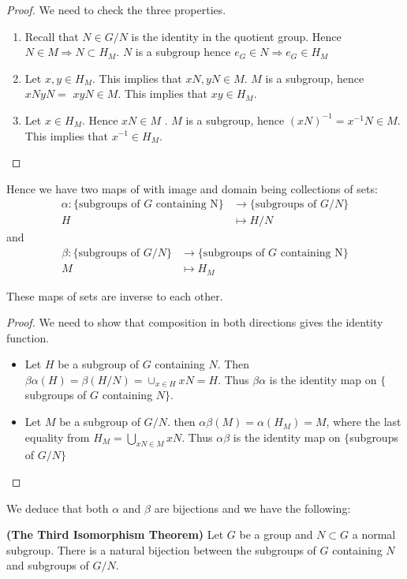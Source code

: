 \documentclass{article}
\newcommand{\bfs}[1]{\textbf{({#1}) }}
\begin{document}
\begin{proof}We need to check the three properties.
\begin{enumerate}
    \item Recall that $N \in G / N$ is the identity in the quotient group. Hence $N \in M \Rightarrow N \subset H_{M}$. $N$ is a subgroup hence $e_{G} \in N \Rightarrow e_{G} \in H_{M}$
    \item Let $x, y \in H_{M}$. This implies that $x N, y N \in M$. $M$ is a subgroup, hence $x N y N=$ $x y N \in M$. This implies that $x y \in H_{M}$.
    \item Let $x \in H_{M} .$ Hence $x N \in M$ . $M$ is a subgroup, hence $(x N)^{-1}=x^{-1} N \in M$. This implies that $x^{-1} \in H_{M}$.
\end{enumerate}
\end{proof}

Hence we have two maps of with image and domain being collections of sets:
\begin{align*}
    \alpha:\{ \text{subgroups of } G \text{ containing N}\} &\longrightarrow\{ \text{subgroups of }G / N\}\\
    H &\mapsto H / N
\end{align*}
and
\begin{align*}
    \beta:\{ \text{subgroups of }G / N\} &\longrightarrow\{ \text{subgroups of } G \text{ containing N}\} \\
    M &\mapsto H_M
\end{align*}

\begin{lema}
These maps of sets are inverse to each other.
\end{lema} 
\begin{proof}We need to show that composition in both directions gives the identity function.
\begin{itemize}
    \item  Let $H$ be a subgroup of $G$ containing $N$. Then $\beta \alpha(H)=\beta(H / N)=\cup_{x\in H}xN=H$. Thus $\beta \alpha$ is the identity map on $\{$subgroups of $G$ containing $N\}$.
    \item Let $M$ be a subgroup of $G / N$. then $\alpha \beta(M)=\alpha\left(H_{M}\right)=M$, where the last equality from $H_M=\bigcup_{xN\in M} xN$. Thus $\alpha \beta$ is the identity map on $\{$subgroups of $G / N\}$
\end{itemize}
\end{proof}

We deduce that both $\alpha$ and $\beta$ are bijections and we have the following:
\begin{thma}{\bfs{The Third Isomorphism Theorem}}\label{thm:thirdiso}
Let $G$ be a group and $N \subset G$ a normal subgroup. There is a natural bijection between the subgroups of $G$ containing $N$ and subgroups of $G / N .$
\end{thma} 
\end{document}
